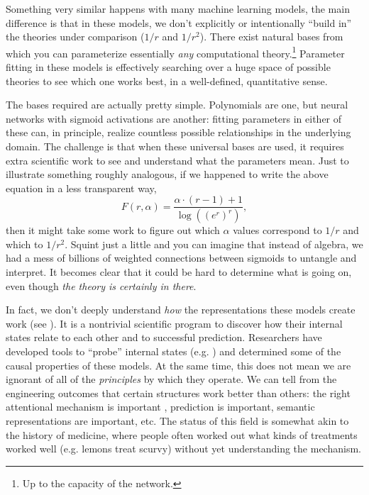 \documentclass[output=paper,colorlinks,citecolor=brown
]{langscibook}
\begin{document}
Something very similar happens with many machine learning models, the main difference is that in these models, we don't explicitly or intentionally ``build in'' the theories under comparison ($1/r$ and $1/r^2$). There exist natural bases from which you can parameterize essentially \emph{any} computational theory.\footnote{Up to the capacity of the network.} Parameter fitting in these models is effectively searching over a huge space of possible theories to see which one works best, in a well-defined, quantitative sense. 

The bases required are actually pretty simple. Polynomials are one, but neural networks with sigmoid activations are another: fitting parameters in either of these can, in principle, realize countless possible relationships in the underlying domain. The challenge is that when these universal bases are used, it requires extra scientific work to see and understand what the parameters mean. Just to illustrate something roughly analogous, if we happened to write the above equation in a less transparent way, 
$$
F(r,\alpha) = \frac{\alpha \cdot (r-1) + 1}{\log \left(\left(e^r\right)^{r}\right)},
$$
then it might take some work to figure out which $\alpha$ values correspond to $1/r$ and which to $1/r^2$. Squint just a little and you can imagine that instead of algebra, we had a mess of billions of weighted connections between sigmoids to untangle and interpret. It becomes clear that it could be hard to determine what is going on, even though \emph{the theory is certainly in there}. %

In fact, we don't deeply understand \emph{how} the representations these models create work (see \cite{rogers2021primer}). It is a nontrivial scientific program to discover how their internal states relate to each other and to successful prediction. Researchers have developed tools to ``probe'' internal states (e.g. \cite{belinkov2019analysis,tenney2019you,kim2019probing,linzen2021syntactic,warstadt2022artificial,pavlick2022semantic}) and determined some of the causal properties of these models. At the same time, this does not mean we are ignorant of all of the \emph{principles} by which they operate. We can tell from the engineering outcomes that certain structures work better than others: the right attentional mechanism is important \citep{vaswani2017attention}, prediction is important, semantic representations are important, etc. The status of this field is somewhat akin to the history of medicine, where people often worked out what kinds of treatments worked well (e.g. lemons treat scurvy) without yet understanding the mechanism. 
\end{document}
